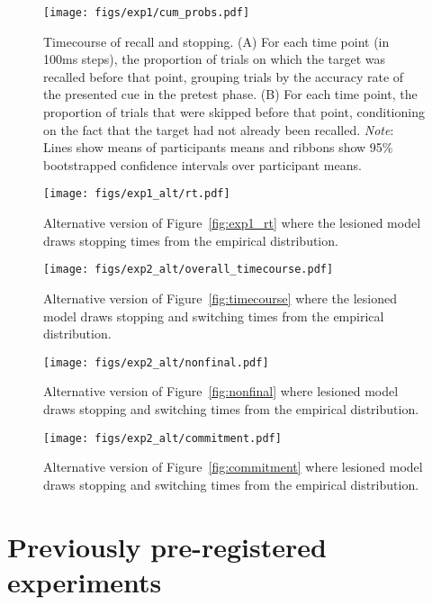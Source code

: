 \begin{figure*}[]
  \texttt{[image: figs/exp1/cum\_probs.pdf]}
  \caption{%
    Timecourse of recall and stopping.
    (A) For each time point (in 100ms steps), the proportion of trials on which the target was recalled before that point, grouping trials by the accuracy rate of the presented cue in the pretest phase.
    (B) For each time point, the proportion of trials that were skipped before that point, conditioning on the fact that the target had not already been recalled.
    \emph{Note}: Lines show means of participants means and ribbons show 95\% bootstrapped confidence intervals over participant means.
  }
  \label{fig:exp1_cum}
\end{figure*}


\begin{figure*}[]
  \texttt{[image: figs/exp1\_alt/rt.pdf]}
  \caption{Alternative version of Figure~\ref{fig:exp1_rt} where the lesioned model draws stopping times from the empirical distribution.}
  \label{fig:exp1_rt_alt}
\end{figure*}

\begin{figure*}[ht]
  \centering
  \texttt{[image: figs/exp2\_alt/overall\_timecourse.pdf]}
  \caption{Alternative version of Figure~\ref{fig:timecourse} where the lesioned model draws stopping and switching times from the empirical distribution.}
  \label{fig:timecourse_alt}
\end{figure*}

\begin{figure*}[t]
  \texttt{[image: figs/exp2\_alt/nonfinal.pdf]}
  \caption{Alternative version of Figure~\ref{fig:nonfinal} where lesioned model draws stopping and switching times from the empirical distribution.}
  \label{fig:nonfinal_alt}
\end{figure*}

\begin{figure*}[t]
  \texttt{[image: figs/exp2\_alt/commitment.pdf]}
  \caption{Alternative version of Figure~\ref{fig:commitment} where lesioned model draws stopping and switching times from the empirical distribution.}
  \label{fig:commitment_alt}
\end{figure*}


\section{Previously pre-registered experiments}\label{app:previous}

